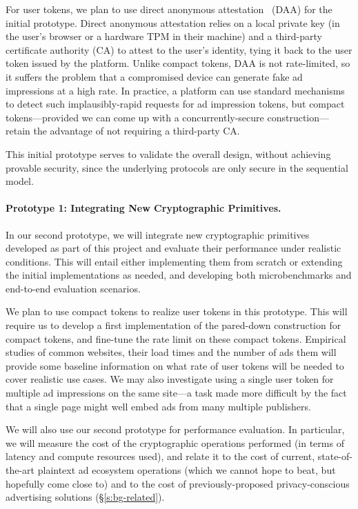 %
For user tokens, we plan to use direct anonymous attestation~\cite{direct-anon-attest} (DAA) for the initial prototype.
%
Direct anonymous attestation relies on a local private key (in the user's browser or a hardware TPM in their machine) and a third-party certificate authority (CA) to attest to the user's identity, tying it back to the user token issued by the platform.
%
Unlike compact tokens, DAA is not rate-limited, so it suffers the problem that a compromised device can generate fake ad impressions at a high rate.
%
In practice, a platform can use standard mechanisms to detect such implausibly-rapid requests for ad impression tokens, but compact tokens---provided we can come up with a concurrently-secure construction---retain the advantage of not requiring a third-party CA.
%

%
This initial prototype serves to validate the overall design, without achieving provable security, since the underlying protocols are only secure in the sequential model.
%

\paragraph{Prototype 1: Integrating New Cryptographic Primitives.}
%
In our second prototype, we will integrate new cryptographic primitives developed as part of this project and evaluate their performance under realistic conditions.
%
This will entail either implementing them from scratch or extending the initial implementations as needed, and developing both microbenchmarks and end-to-end evaluation scenarios.
%

%
We plan to use compact tokens to realize user tokens in this prototype.
%
This will require us to develop a first implementation of the pared-down construction for compact tokens, and fine-tune the rate limit on these compact tokens.
%
Empirical studies of common websites, their load times and the number of ads them will provide some baseline information on what rate of user tokens will be needed to cover realistic use cases.
%
We may also investigate using a single user token for multiple ad impressions on the same site---a task made more difficult by the fact that a single page might well embed ads from many multiple publishers.
%

%
We will also use our second prototype for performance evaluation.
%
In particular, we will measure the cost of the cryptographic operations performed (in terms of latency and compute resources used), and relate it to the cost of current, state-of-the-art plaintext ad ecosystem operations (which we cannot hope to beat, but hopefully come close to) and to the cost of previously-proposed privacy-conscious advertising solutions (\S\ref{s:bg-related}).
%

